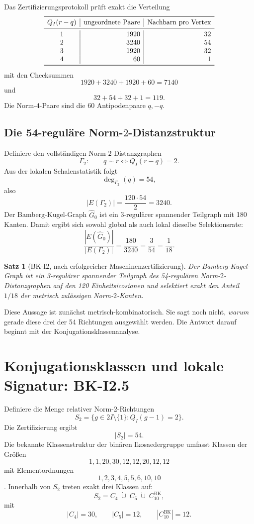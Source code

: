 \documentclass[11pt,a4paper]{article}
\newtheorem{satz}{Satz}[section]
\theoremstyle{definition}
\newcommand{\twoI}{2I}
\newcommand{\QI}{Q_I}
\begin{document}
Das Zertifizierungsprotokoll prüft exakt die Verteilung
\[
\begin{array}{c|r|r}
\toprule
\QI(r-q) & \text{ungeordnete Paare} & \text{Nachbarn pro Vertex}\\
\midrule
1 & 1920 & 32\\
2 & 3240 & 54\\
3 & 1920 & 32\\
4 & 60 & 1\\
\bottomrule
\end{array}
\]
mit den Checksummen
\[
1920+3240+1920+60=7140
\]
und
\[
32+54+32+1=119.
\]
Die Norm-\(4\)-Paare sind die 60 Antipodenpaare \(q,-q\).

\subsection{Die 54-reguläre Norm-\(2\)-Distanzstruktur}

Definiere den vollständigen Norm-\(2\)-Distanzgraphen
\[
\Gamma_2:
\qquad
q\sim r
\Longleftrightarrow
\QI(r-q)=2.
\]
Aus der lokalen Schalenstatistik folgt
\[
\deg_{\Gamma_2}(q)=54,
\]
also
\[
|E(\Gamma_2)|
=\frac{120\cdot54}{2}
=3240.
\]
Der Bamberg-Kugel-Graph \(\widehat G_0\) ist ein 3-regulärer spannender Teilgraph mit 180 Kanten. Damit ergibt sich sowohl global als auch lokal dieselbe Selektionsrate:
\[
\boxed{
\frac{|E(\widehat G_0)|}{|E(\Gamma_2)|}
=\frac{180}{3240}
=\frac{3}{54}
=\frac1{18}.
}
\]

\begin{satz}[BK-I2, nach erfolgreicher Maschinenzertifizierung]
Der Bamberg-Kugel-Graph ist ein 3-regulärer spannender Teilgraph des 54-regulären Norm-\(2\)-Distanzgraphen auf den 120 Einheitsicosianen und selektiert exakt den Anteil \(1/18\) der metrisch zulässigen Norm-\(2\)-Kanten.
\end{satz}

Diese Aussage ist zunächst metrisch-kombinatorisch. Sie sagt noch nicht, \emph{warum} gerade diese drei der 54 Richtungen ausgewählt werden. Die Antwort darauf beginnt mit der Konjugationsklassenanalyse.

\section{Konjugationsklassen und lokale Signatur: BK-I2.5}

Definiere die Menge relativer Norm-\(2\)-Richtungen
\[
S_2=
\{g\in\twoI\setminus\{1\}:\QI(g-1)=2\}.
\]
Die Zertifizierung ergibt
\[
|S_2|=54.
\]
Die bekannte Klassenstruktur der binären Ikosaedergruppe umfasst Klassen der Größen
\[
1,1,20,30,12,12,20,12,12
\]
mit Elementordnungen
\[
1,2,3,4,5,5,6,10,10
\]
\cite{nLab2I}. Innerhalb von \(S_2\) treten exakt drei Klassen auf:
\[
\boxed{
S_2=C_4\;\dot\cup\;C_5\;\dot\cup\;C_{10}^{\mathrm{BK}},
}
\]
mit
\[
|C_4|=30,\qquad |C_5|=12,\qquad
|C_{10}^{\mathrm{BK}}|=12.
\]
\end{document}

